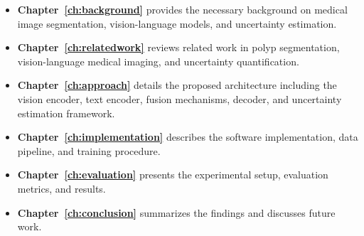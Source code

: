 \begin{itemize}
	\item \textbf{Chapter~\ref{ch:background}} provides the necessary background on medical image segmentation, vision-language models, and uncertainty estimation.
	\item \textbf{Chapter~\ref{ch:relatedwork}} reviews related work in polyp segmentation, vision-language medical imaging, and uncertainty quantification.
	\item \textbf{Chapter~\ref{ch:approach}} details the proposed architecture including the vision encoder, text encoder, fusion mechanisms, decoder, and uncertainty estimation framework.
	\item \textbf{Chapter~\ref{ch:implementation}} describes the software implementation, data pipeline, and training procedure.
	\item \textbf{Chapter~\ref{ch:evaluation}} presents the experimental setup, evaluation metrics, and results.
	\item \textbf{Chapter~\ref{ch:conclusion}} summarizes the findings and discusses future work.
\end{itemize}
